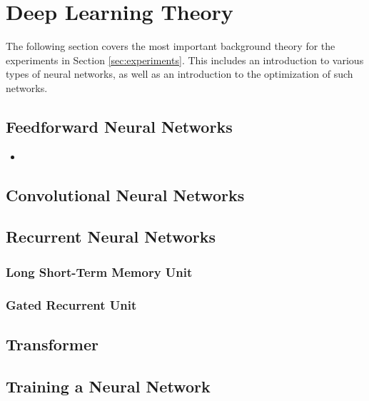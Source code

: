 \documentclass[./main.tex]{subfiles}
\begin{document}
\section{Deep Learning Theory}
The following section covers the most important background theory for the experiments in Section \ref{sec:experiments}. This includes an introduction to various types of neural networks, as well as an introduction to the optimization of such networks.

\subsection{Feedforward Neural Networks}
\begin{itemize}
    \item 
\end{itemize}
\subsection{Convolutional Neural Networks}
\subsection{Recurrent Neural Networks}
\subsubsection{Long Short-Term Memory Unit}
\subsubsection{Gated Recurrent Unit}
\subsection{Transformer}
\subsection{Training a Neural Network}
\end{document}
